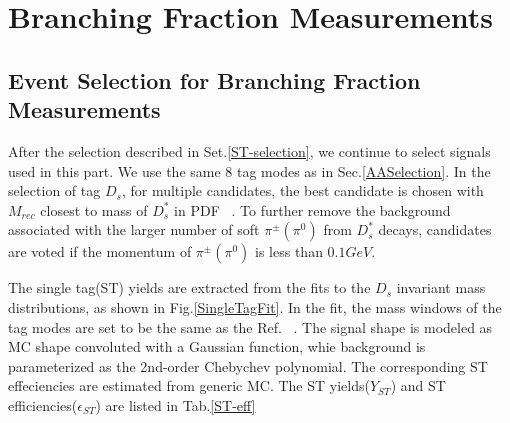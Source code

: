 \section{Branching Fraction Measurements}

\subsection{Event Selection for Branching Fraction Measurements}
\label{BFSelection}
After the selection described in Set.\ref{ST-selection}, we continue to select signals used in this part. 
We use the same 8 tag modes as in Sec.\ref{AASelection}.
In the selection of tag $D_{s}$, for multiple candidates, the best candidate is chosen with $M_{rec}$ closest to mass of $D_{s}^{*}$ in PDF ~\cite{PDG2018}.
To further remove the background associated with the larger number of soft $\pi^{\pm}(\pi^{0})$ from $D_{s}^{*}$ decays, candidates are voted if the momentum of $\pi^{\pm}(\pi^{0})$ is less than $0.1GeV$.

The single tag(ST) yields are extracted from the fits to the $D_{s}$ invariant mass distributions, as shown in Fig.\ref{SingleTagFit}. In the fit, the mass windows of the tag modes are set to be the same as the Ref. ~\cite{Doc-DB-630-v35}.
The signal shape is modeled as MC shape convoluted with a Gaussian function, whie background is parameterized as the 2nd-order Chebychev polynomial.
The corresponding ST effeciencies are estimated from generic MC. The ST yields($Y_{ST}$) and ST efficiencies($\epsilon_{ST}$) are listed in Tab.\ref{ST-eff}

